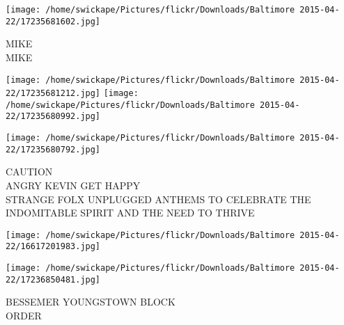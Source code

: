 \documentclass[10pt,letterpaper]{article}
\begin{document}
\vspace{0.25in}
\texttt{[image: /home/swickape/Pictures/flickr/Downloads/Baltimore 2015-04-22/17235681602.jpg]}

MIKE\\
MIKE
\pagebreak

\texttt{[image: /home/swickape/Pictures/flickr/Downloads/Baltimore 2015-04-22/17235681212.jpg]}
\texttt{[image: /home/swickape/Pictures/flickr/Downloads/Baltimore 2015-04-22/17235680992.jpg]}

\texttt{[image: /home/swickape/Pictures/flickr/Downloads/Baltimore 2015-04-22/17235680792.jpg]}

CAUTION\\
ANGRY KEVIN GET HAPPY\\
STRANGE FOLX UNPLUGGED ANTHEMS TO CELEBRATE THE INDOMITABLE SPIRIT AND THE NEED TO THRIVE
\pagebreak

\texttt{[image: /home/swickape/Pictures/flickr/Downloads/Baltimore 2015-04-22/16617201983.jpg]}

\vspace{0.25in}
\texttt{[image: /home/swickape/Pictures/flickr/Downloads/Baltimore 2015-04-22/17236850481.jpg]}

BESSEMER YOUNGSTOWN BLOCK\\
ORDER
\pagebreak
\end{document}

